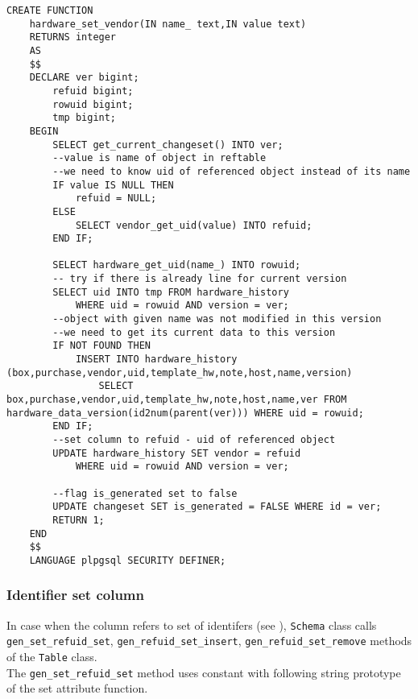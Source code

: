 \documentclass[deska]{subfiles}
\begin{document}
\begin{verbatim}
CREATE FUNCTION
    hardware_set_vendor(IN name_ text,IN value text)
    RETURNS integer
    AS
    $$
    DECLARE ver bigint;
        refuid bigint;
        rowuid bigint;
        tmp bigint;
    BEGIN
        SELECT get_current_changeset() INTO ver;
        --value is name of object in reftable
        --we need to know uid of referenced object instead of its name
        IF value IS NULL THEN
            refuid = NULL;
        ELSE
            SELECT vendor_get_uid(value) INTO refuid;
        END IF;

        SELECT hardware_get_uid(name_) INTO rowuid;
        -- try if there is already line for current version
        SELECT uid INTO tmp FROM hardware_history
            WHERE uid = rowuid AND version = ver;
        --object with given name was not modified in this version
        --we need to get its current data to this version
        IF NOT FOUND THEN
            INSERT INTO hardware_history (box,purchase,vendor,uid,template_hw,note,host,name,version)
                SELECT box,purchase,vendor,uid,template_hw,note,host,name,ver FROM hardware_data_version(id2num(parent(ver))) WHERE uid = rowuid;
        END IF;
        --set column to refuid - uid of referenced object
        UPDATE hardware_history SET vendor = refuid
            WHERE uid = rowuid AND version = ver;

        --flag is_generated set to false
        UPDATE changeset SET is_generated = FALSE WHERE id = ver;
        RETURN 1;
    END
    $$
    LANGUAGE plpgsql SECURITY DEFINER;
\end{verbatim}

\subsubsection{Identifier set column}
In case when the column refers to set of identifers (see ), {\tt Schema} class calls {\tt gen\_set\_refuid\_set},  {\tt gen\_refuid\_set\_insert}, {\tt gen\_refuid\_set\_remove} methods of the {\tt Table} class.\\
The {\tt gen\_set\_refuid\_set} method uses constant with following string prototype of the set attribute function.
\end{document}
